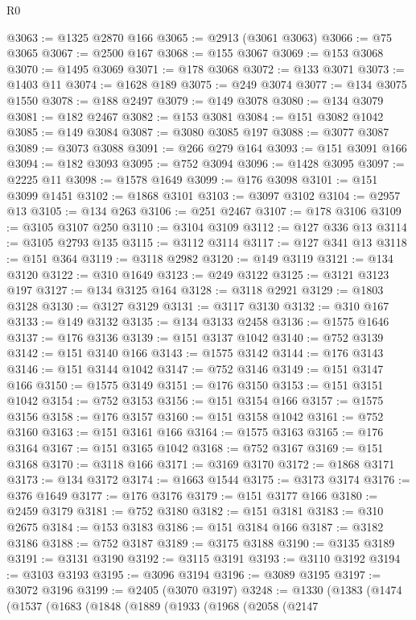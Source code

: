 \begin{lexlean}{R0}
\begin{coremodule}
@3063 := @1325 @2870 @166
@3065 := @2913 (@3061 @3063)
@3066 := @75 @3065
@3067 := @2500 @167
@3068 := @155 @3067
@3069 := @153 @3068
@3070 := @1495 @3069
@3071 := @178 @3068
@3072 := @133 @3071
@3073 := @1403 @11
@3074 := @1628 @189
@3075 := @249 @3074
@3077 := @134 @3075 @1550
@3078 := @188 @2497
@3079 := @149 @3078
@3080 := @134 @3079
@3081 := @182 @2467
@3082 := @153 @3081
@3084 := @151 @3082 @1042
@3085 := @149 @3084
@3087 := @3080 @3085 @197
@3088 := @3077 @3087
@3089 := @3073 @3088
@3091 := @266 @279 @164
@3093 := @151 @3091 @166
@3094 := @182 @3093
@3095 := @752 @3094
@3096 := @1428 @3095
@3097 := @2225 @11
@3098 := @1578 @1649
@3099 := @176 @3098
@3101 := @151 @3099 @1451
@3102 := @1868 @3101
@3103 := @3097 @3102
@3104 := @2957 @13
@3105 := @134 @263
@3106 := @251 @2467
@3107 := @178 @3106
@3109 := @3105 @3107 @250
@3110 := @3104 @3109
@3112 := @127 @336 @13
@3114 := @3105 @2793 @135
@3115 := @3112 @3114
@3117 := @127 @341 @13
@3118 := @151 @364
@3119 := @3118 @2982
@3120 := @149 @3119
@3121 := @134 @3120
@3122 := @310 @1649
@3123 := @249 @3122
@3125 := @3121 @3123 @197
@3127 := @134 @3125 @164
@3128 := @3118 @2921
@3129 := @1803 @3128
@3130 := @3127 @3129
@3131 := @3117 @3130
@3132 := @310 @167
@3133 := @149 @3132
@3135 := @134 @3133 @2458
@3136 := @1575 @1646
@3137 := @176 @3136
@3139 := @151 @3137 @1042
@3140 := @752 @3139
@3142 := @151 @3140 @166
@3143 := @1575 @3142
@3144 := @176 @3143
@3146 := @151 @3144 @1042
@3147 := @752 @3146
@3149 := @151 @3147 @166
@3150 := @1575 @3149
@3151 := @176 @3150
@3153 := @151 @3151 @1042
@3154 := @752 @3153
@3156 := @151 @3154 @166
@3157 := @1575 @3156
@3158 := @176 @3157
@3160 := @151 @3158 @1042
@3161 := @752 @3160
@3163 := @151 @3161 @166
@3164 := @1575 @3163
@3165 := @176 @3164
@3167 := @151 @3165 @1042
@3168 := @752 @3167
@3169 := @151 @3168
@3170 := @3118 @166
@3171 := @3169 @3170
@3172 := @1868 @3171
@3173 := @134 @3172
@3174 := @1663 @1544
@3175 := @3173 @3174
@3176 := @376 @1649
@3177 := @176 @3176
@3179 := @151 @3177 @166
@3180 := @2459 @3179
@3181 := @752 @3180
@3182 := @151 @3181
@3183 := @310 @2675
@3184 := @153 @3183
@3186 := @151 @3184 @166
@3187 := @3182 @3186
@3188 := @752 @3187
@3189 := @3175 @3188
@3190 := @3135 @3189
@3191 := @3131 @3190
@3192 := @3115 @3191
@3193 := @3110 @3192
@3194 := @3103 @3193
@3195 := @3096 @3194
@3196 := @3089 @3195
@3197 := @3072 @3196
@3199 := @2405 (@3070 @3197)
@3248 := @1330
    (@1383
      (@1474
        (@1537
          (@1683
            (@1848
              (@1889
                (@1933
                  (@1968
                    (@2058
                      (@2147

\end{coremodule}
\end{lexlean}

